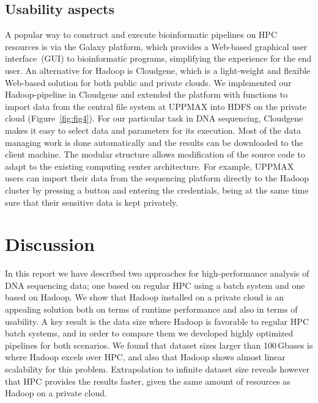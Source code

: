 \documentclass[10pt]{article}
\begin{document}
\subsection*{Usability aspects}
\label{subsectionIV_2}

A popular way to construct and execute bioinformatic pipelines on HPC resources is via the Galaxy\cite{galaxy} platform, which provides a Web-based graphical user interface~(GUI) to bioinformatic programs, simplifying the experience for the end user. 
An alternative for Hadoop is Cloudgene\cite{cloudgene}, which is a light-weight and flexible Web-based solution for both public and private clouds. We implemented our Hadoop-pipeline in Cloudgene and extended the platform with functions to import data from the central file system at UPPMAX into HDFS on the private cloud (Figure~\ref{fig:fig4}).
For our particular task in DNA sequencing, Cloudgene makes it easy to select data and parameters for its execution. Most of the data managing work is done automatically and the results can be downloaded to the client machine. The modular structure allows modification of the source code to adapt to the existing computing center architecture. For example, UPPMAX users can import their data from the sequencing platform directly to the Hadoop cluster by pressing a button and entering the credentials, being at the same time sure that their sensitive data is kept privately.





\section*{Discussion}

In this report we have described two approaches for high-performance analysis of DNA sequencing data; one based on regular HPC using a batch system and one based on Hadoop. We show that Hadoop installed on a private cloud is an appealing solution both on terms of runtime performance and also in terms of usability. A key result is the data size where Hadoop is favorable to regular HPC batch systems, and in order to compare them we developed highly optimized pipelines for both scenarios. We found that dataset sizes larger than 100\,Gbases is where Hadoop excels over HPC, and also that Hadoop shows almost linear scalability for this problem. Extrapolation to infinite dataset size reveals however that HPC provides the results faster, given the same amount of resources as Hadoop on a private cloud.
\end{document}
